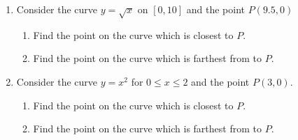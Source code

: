 \documentclass[12pt]{article}
\newif\ifans
\begin{document}
\begin{enumerate}
\begin{enumerate}
\end{enumerate}

\item Consider the curve $y=\sqrt{x}$ on $[0,10]$ and the point $P(9.5,0)$

\begin{enumerate}

\item Find the point on the curve which is closest to $P$.

\ifans{\fbox{$(9,3)$ which is a distance of $\frac{1}{2}\sqrt{37}$ from $P$.}} \fi

\item Find the point on the curve which is farthest from to $P$.

\ifans{\fbox{$(0,0)$ which is a distance of $\frac{19}{2}$ from $P$}} \fi

\end{enumerate}

\item Consider the curve $y=x^2$ for $0\leq x \leq 2$ and the point $P(3,0)$.

\begin{enumerate}

\item Find the point on the curve which is closest to $P$.

\ifans{\fbox{$(1,1)$ which is a distance of $\sqrt{5}$ from $P$.}} \fi

\item Find the point on the curve which is farthest from to $P$.

\ifans{\fbox{$(2,4)$ which is a distance of $\sqrt{17}$ from $P$}} \fi

\end{enumerate}

\end{enumerate}
\end{document}
